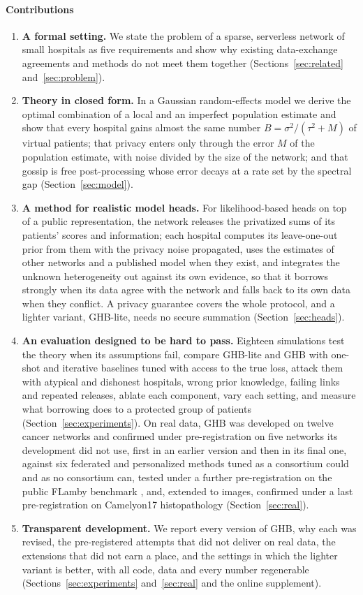 \documentclass[acmsmall,screen,review]{acmart}
\theoremstyle{acmdefinition}
\begin{document}
\paragraph{Contributions}
\begin{enumerate}[leftmargin=*]
\item \textbf{A formal setting.} We state the problem of a sparse, serverless network of small hospitals as five requirements and show why existing data-exchange agreements and methods do not meet them together (Sections~\ref{sec:related} and~\ref{sec:problem}).
\item \textbf{Theory in closed form.} In a Gaussian random-effects model we derive the optimal combination of a local and an imperfect population estimate and show that every hospital gains almost the same number $B=\sigma^2/(\tau^2+M)$ of virtual patients; that privacy enters only through the error $M$ of the population estimate, with noise divided by the size of the network; and that gossip is free post-processing whose error decays at a rate set by the spectral gap (Section~\ref{sec:model}).
\item \textbf{A method for realistic model heads.} For likelihood-based heads on top of a public representation, the network releases the privatized sums of its patients' scores and information; each hospital computes its leave-one-out prior from them with the privacy noise propagated, uses the estimates of other networks and a published model when they exist, and integrates the unknown heterogeneity out against its own evidence, so that it borrows strongly when its data agree with the network and falls back to its own data when they conflict. A privacy guarantee covers the whole protocol, and a lighter variant, GHB-lite, needs no secure summation (Section~\ref{sec:heads}).
\item \textbf{An evaluation designed to be hard to pass.} Eighteen simulations test the theory when its assumptions fail, compare GHB-lite and GHB with one-shot and iterative baselines tuned with access to the true loss, attack them with atypical and dishonest hospitals, wrong prior knowledge, failing links and repeated releases, ablate each component, vary each setting, and measure what borrowing does to a protected group of patients (Section~\ref{sec:experiments}). On real data, GHB was developed on twelve cancer networks and confirmed under pre-registration on five networks its development did not use, first in an earlier version and then in its final one, against six federated and personalized methods tuned as a consortium could and as no consortium can, tested under a further pre-registration on the public FLamby benchmark \cite{ogierduterrail2022flamby}, and, extended to images, confirmed under a last pre-registration on Camelyon17 histopathology (Section~\ref{sec:real}).
\item \textbf{Transparent development.} We report every version of GHB, why each was revised, the pre-registered attempts that did not deliver on real data, the extensions that did not earn a place, and the settings in which the lighter variant is better, with all code, data and every number regenerable (Sections~\ref{sec:experiments} and~\ref{sec:real} and the online supplement).
\end{enumerate}
\end{document}
